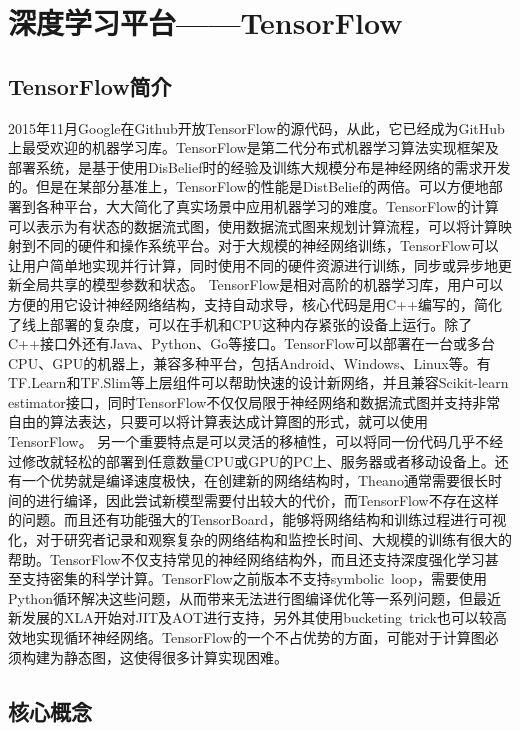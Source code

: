 \chapter{深度学习平台——TensorFlow}
	\section{TensorFlow简介}
	2015年11月Google在Github开放TensorFlow的源代码，从此，它已经成为GitHub上最受欢迎的机器学习库。TensorFlow是第二代分布式机器学习算法实现框架及部署系统，是基于使用DisBelief时的经验及训练大规模分布是神经网络的需求开发的。但是在某部分基准上，TensorFlow的性能是DistBelief的两倍。可以方便地部署到各种平台，大大简化了真实场景中应用机器学习的难度。TensorFlow的计算可以表示为有状态的数据流式图，使用数据流式图来规划计算流程，可以将计算映射到不同的硬件和操作系统平台。对于大规模的神经网络训练，TensorFlow可以让用户简单地实现并行计算，同时使用不同的硬件资源进行训练，同步或异步地更新全局共享的模型参数和状态。
	TensorFlow是相对高阶的机器学习库，用户可以方便的用它设计神经网络结构，支持自动求导，核心代码是用C++编写的，简化了线上部署的复杂度，可以在手机和CPU这种内存紧张的设备上运行。除了C++接口外还有Java、Python、Go等接口。TensorFlow可以部署在一台或多台CPU、GPU的机器上，兼容多种平台，包括Android、Windows、Linux等。有TF.Learn和TF.Slim等上层组件可以帮助快速的设计新网络，并且兼容Scikit-learn estimator接口，同时TensorFlow不仅仅局限于神经网络和数据流式图并支持非常自由的算法表达，只要可以将计算表达成计算图的形式，就可以使用TensorFlow。
	另一个重要特点是可以灵活的移植性，可以将同一份代码几乎不经过修改就轻松的部署到任意数量CPU或GPU的PC上、服务器或者移动设备上。还有一个优势就是编译速度极快，在创建新的网络结构时，Theano通常需要很长时间的进行编译，因此尝试新模型需要付出较大的代价，而TensorFlow不存在这样的问题。而且还有功能强大的TensorBoard，能够将网络结构和训练过程进行可视化，对于研究者记录和观察复杂的网络结构和监控长时间、大规模的训练有很大的帮助。TensorFlow不仅支持常见的神经网络结构外，而且还支持深度强化学习甚至支持密集的科学计算。TensorFlow之前版本不支持symbolic loop，需要使用Python循环解决这些问题，从而带来无法进行图编译优化等一系列问题，但最近新发展的XLA开始对JIT及AOT进行支持，另外其使用bucketing trick也可以较高效地实现循环神经网络。TensorFlow的一个不占优势的方面，可能对于计算图必须构建为静态图，这使得很多计算实现困难。
	\section{核心概念}

